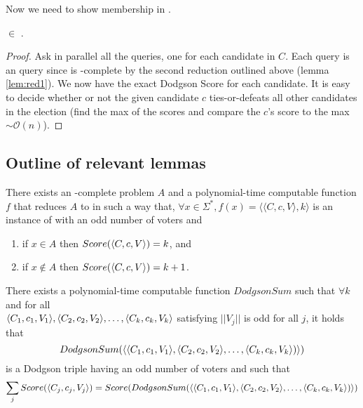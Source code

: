 Now we need to show membership in \tp.
\begin{theorem} \label{thm:intp}
     $\in$ \tp. \\
\end{theorem}

\begin{proof}
    Ask in parallel all the  queries,
    one for each candidate in $C$.
    Each query is an \np query since  is \np-complete by
    the second reduction outlined above (lemma \ref{lem:red1}).
    We now have the exact Dodgson Score for each candidate.
    It is easy to decide
    whether or not the given candidate $c$ ties-or-defeats all other candidates in
    the election (find the max of the scores and compare the $c$'s score to
    the max $\sim\mathcal{O}(n)$).
\end{proof}

\subsection{Outline of relevant lemmas}

\begin{lemma} \label{lem:red1}
    There exists an \np-complete problem $A$ and a polynomial-time
    computable function $f$ that reduces $A$ to \dscore in such
    a way that, $\forall x \in \Sigma^*,
    f(x) = \langle \langle C,c,V \rangle, k\rangle $
    is an instance of \dscore with an odd number of voters and
    \begin{enumerate}
        \item if $x\in A$ then $Score(\langle C,c,V \rangle) = k$, and
        \item if $x\notin A$ then $Score(\langle C,c,V \rangle) = k+1$.
    \end{enumerate}
\end{lemma}

\begin{lemma} \label{lem:merge1}
    There exists a polynomial-time computable function
    $DodgsonSum$ such that $\forall k$ and for all\\
    $\langle C_{1},c_{1},V_{1} \rangle,\langle C_{2},c_{2},V_{2} \rangle, \dots, \langle C_{k},c_{k},V_{k} \rangle$ satisfying
    $||V_j||$ is odd for all $ j$, it holds that
    \[DodgsonSum(\langle \langle C_{1},c_{1},V_{1} \rangle,\langle C_{2},c_{2},V_{2} \rangle, \dots,
    \langle C_{k},c_{k},V_{k} \rangle) \rangle)\]
    is a Dodgson triple having an odd number of voters and such that
    \[\sum_j Score(\langle C_{j},c_{j},V_{j} \rangle) =
    Score(DodgsonSum(\langle \langle C_{1},c_{1},V_{1} \rangle,\langle C_{2},c_{2},V_{2} \rangle, \dots,
    \langle C_{k},c_{k},V_{k} \rangle) \rangle)\]
\end{lemma}

